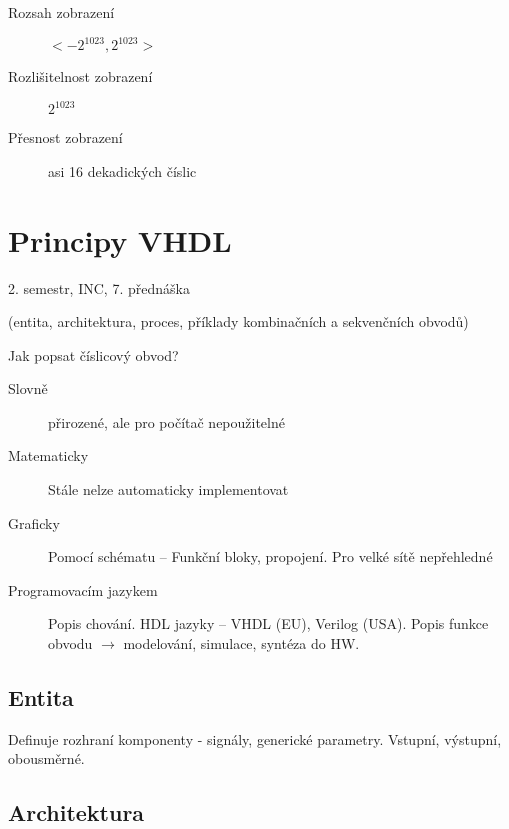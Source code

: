 \documentclass[a4paper, 11pt]{report}
\begin{document}
\begin{description}
	\item[Rozsah zobrazení] $< -2^{1023}, 2^{1023} >$
	\item[Rozlišitelnost zobrazení] $2^1023$
	\item[Přesnost zobrazení] asi 16 dekadických číslic
\end{description}


















\setcounter{chapter}{9}
\chapter{Principy VHDL} \label{cha:10}

2. semestr, INC, 7. přednáška

(entita, architektura, proces, příklady kombinačních a sekvenčních obvodů)

Jak popsat číslicový obvod?
\begin{description}
	\item[Slovně] přirozené, ale pro počítač nepoužitelné
	\item[Matematicky] Stále nelze automaticky implementovat
	\item[Graficky] Pomocí schématu -- Funkční bloky, propojení. Pro velké sítě nepřehledné
	\item[Programovacím jazykem] Popis chování. HDL jazyky -- VHDL (EU), Verilog (USA). Popis funkce obvodu $\to$ modelování, simulace, syntéza do HW.
\end{description}

\section{Entita}

Definuje rozhraní komponenty - signály, generické parametry. Vstupní, výstupní, obousměrné.

\section{Architektura}
\end{document}
